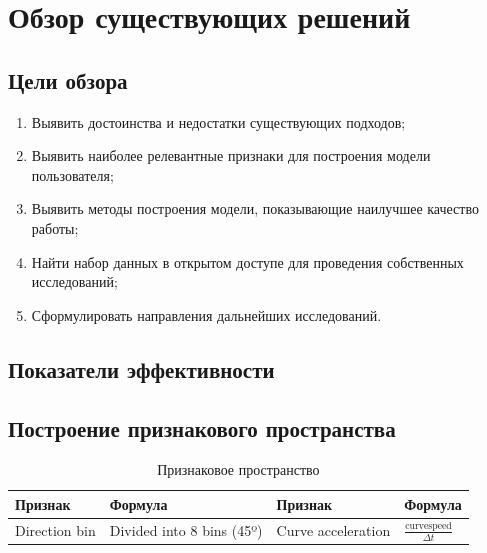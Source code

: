\documentclass[12pt]{article}
\begin{document}
    \newpage



    \section{Обзор существующих решений}
    \label{sec:Overview}
    
    \subsection{Цели обзора}
    \label{sec:Overview:Goals}

    \begin{enumerate}
        \item Выявить достоинства и недостатки существующих подходов;
        \item Выявить наиболее релевантные признаки для построения модели пользователя;
        \item Выявить методы построения модели, показывающие наилучшее качество работы;
        \item Найти набор данных в открытом доступе для проведения собственных исследований;
        \item Сформулировать направления дальнейших исследований.
    \end{enumerate}


    \subsection{Показатели эффективности}
    \label{sec:Overview:Metrics}


    \subsection{Построение признакового пространства}
    \label{sec:Overview:Features}
    
    \begin{table}[h]
        \caption{Признаковое пространство}
        \centering
        \begin{tabular}{ || l | l || l | l ||}
            \hline
            Признак & Формула &  Признак & Формула \\ [5mm] \hline
            Direction bin & Divided into 8 bins (45º) & Curve acceleration & $\frac{\text{curvespeed}}{\Delta t}$ \\ \hline

            \hline
        \end{tabular}
        \label{sec:Overview:Features:table:FeaturesFormulas}
    \end{table}
\end{document}
